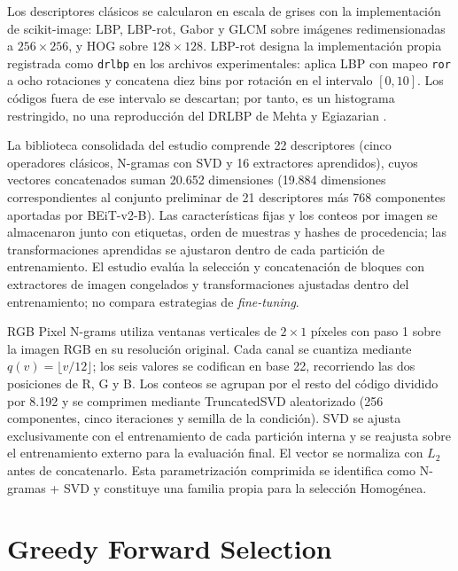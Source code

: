 Los descriptores clásicos se calcularon en escala de grises con la implementación de scikit-image: LBP, LBP-rot, Gabor y GLCM sobre imágenes redimensionadas a $256\times256$, y HOG sobre $128\times128$. LBP-rot designa la implementación propia registrada como \texttt{drlbp} en los archivos experimentales: aplica LBP con mapeo \texttt{ror} a ocho rotaciones y concatena diez bins por rotación en el intervalo $[0,10]$. Los códigos fuera de ese intervalo se descartan; por tanto, es un histograma restringido, no una reproducción del DRLBP de Mehta y Egiazarian \citep{mehta2016drlbp}.

La biblioteca consolidada del estudio comprende 22 descriptores (cinco operadores clásicos, N-gramas con SVD y 16 extractores aprendidos), cuyos vectores concatenados suman 20.652 dimensiones (19.884 dimensiones correspondientes al conjunto preliminar de 21 descriptores más 768 componentes aportadas por BEiT-v2-B). Las características fijas y los conteos por imagen se almacenaron junto con etiquetas, orden de muestras y hashes de procedencia; las transformaciones aprendidas se ajustaron dentro de cada partición de entrenamiento. El estudio evalúa la selección y concatenación de bloques con extractores de imagen congelados y transformaciones ajustadas dentro del entrenamiento; no compara estrategias de \emph{fine-tuning}.

RGB Pixel N-grams \citep{paiva2023rgb} utiliza ventanas verticales de $2\times1$ píxeles con paso 1 sobre la imagen RGB en su resolución original. Cada canal se cuantiza mediante $q(v)=\lfloor v/12\rfloor$; los seis valores se codifican en base 22, recorriendo las dos posiciones de R, G y B. Los conteos se agrupan por el resto del código dividido por 8.192 y se comprimen mediante TruncatedSVD aleatorizado (256 componentes, cinco iteraciones y semilla de la condición). SVD se ajusta exclusivamente con el entrenamiento de cada partición interna y se reajusta sobre el entrenamiento externo para la evaluación final. El vector se normaliza con $L_2$ antes de concatenarlo. Esta parametrización comprimida se identifica como N-gramas + SVD y constituye una familia propia para la selección Homogénea.

\section{Greedy Forward Selection}

